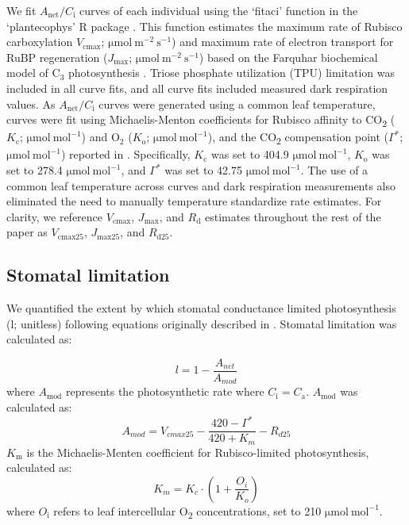     We fit $A_\mathrm{{net}}/C_\mathrm{i}$ curves of each individual using the ‘fitaci’ function in the ‘plantecophys’ R package . This function estimates the maximum rate of Rubisco carboxylation $V_{\mathrm{cmax}}$; $\mathrm{\mu mol\ m^{-2}\ s^{-1}}$) and maximum rate of electron transport for RuBP regeneration ($J_{\mathrm{max}}$; $\mathrm{\mu mol\ m^{-2}\ s^{-1}}$) based on the Farquhar biochemical model of C$_{3}$ photosynthesis . Triose phosphate utilization (TPU) limitation was included in all curve fits, and all curve fits included measured dark respiration values. As $A_\mathrm{{net}}/C_\mathrm{i}$ curves were generated using a common leaf temperature, curves were fit using Michaelis-Menton coefficients for Rubisco affinity to CO\textsubscript{2} ($K_\mathrm{c}$; $\mathrm{\mu mol\ mol^{-1}}$) and $\mathrm{O_2}$ ($K_\mathrm{o}$; $\mathrm{\mu mol\ mol^{-1}}$), and the CO\textsubscript{2} compensation point ($\Gamma^*$; $\mathrm{\mu mol\ mol^{-1}}$) reported in . Specifically, $K_\mathrm{c}$ was set to 404.9 $\mathrm{\mu mol\ mol^{-1}}$, $K_\mathrm{o}$ was set to 278.4 $\mathrm{\mu mol\ mol^{-1}}$, and $\Gamma^*$ was set to 42.75 $\mathrm{\mu mol\ mol^{-1}}$. The use of a common leaf temperature across curves and dark respiration measurements also eliminated the need to manually temperature standardize rate estimates. For clarity, we reference $V_{\mathrm{cmax}}$, $J_{\mathrm{max}}$, and $R_{\mathrm{d}}$ estimates throughout the rest of the paper as $V_{\mathrm{cmax25}}$, $J_{\mathrm{max25}}$, and $R_{\mathrm{d25}}$.

    \subsection{Stomatal limitation}

    We quantified the extent by which stomatal conductance limited photosynthesis (l; unitless) following equations originally described in . Stomatal limitation was calculated as:

    \begin{equation} \label{eq_5.3}
        l = 1 - \frac{A_{net}}{A_{mod}}
    \end{equation}
    \noindent where $A_\mathrm{mod}$ represents the photosynthetic rate where $C_\mathrm{{i}}=C_\mathrm{{a}}$. $A_\mathrm{mod}$ was calculated as:
    \begin{equation} \label{eq_5.4}
        A_{mod} = V_{cmax25} - \frac{420 - \Gamma^*}{420 + K_{m}} - R_{d25}
    \end{equation}
    \noindent $K_\mathrm{m}$ is the Michaelis-Menten coefficient for Rubisco-limited photosynthesis, calculated as:
    \begin{equation} \label{eq_5.5}
        K_{m} = K_{c} \cdot \left ( 1 + \frac{O_i}{K_o} \right )
    \end{equation}
    \noindent where $O_\mathrm{i}$ refers to leaf intercellular O\textsubscript{2} concentrations, set to 210 $\mathrm{\mu mol\ mol^{-1}}$.

